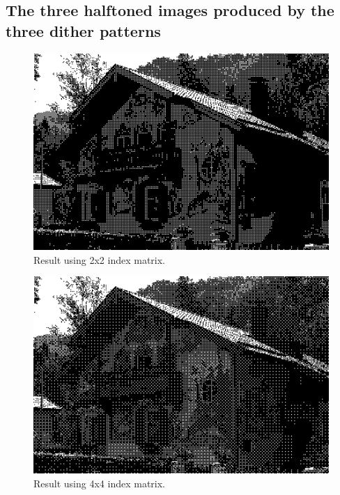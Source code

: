 \documentclass{article}
\begin{document}
\subsection{The three halftoned images produced by the three dither patterns}
\begin{figure}[H]
    \centering
    \includegraphics[width=1\textwidth]{../4-b2x2.png}
    \caption{Result using 2x2 index matrix.}
\end{figure}
\begin{figure}[H]
    \centering
    \includegraphics[width=1\textwidth]{../4-b4x4.png}
    \caption{Result using 4x4 index matrix.}
\end{figure}
\end{document}
